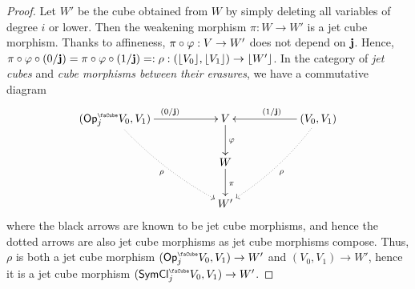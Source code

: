 \documentclass[a4paper]{memoir}
\begin{document}
\begin{proof}
	Let $W'$ be the cube obtained from $W$ by simply deleting all variables of degree $i$ or lower.
	Then the weakening morphism $\pi : W \to W'$ is a jet cube morphism.
	Thanks to affineness, $\pi \circ \varphi : V \to W'$ does not depend on $\mathbf{j}$.
	Hence, $\pi \circ \varphi \circ (0/\mathbf{j}) = \pi \circ \varphi \circ (1/\mathbf{j}) =: \rho : (\mathopen{}\left\lfloor V_0 \right\rfloor\mathclose{}, \mathopen{}\left\lfloor V_1 \right\rfloor\mathclose{}) \to \mathopen{}\left\lfloor W' \right\rfloor\mathclose{}$.
	In the category of \emph{jet cubes} and \emph{cube morphisms between their erasures}, we have a commutative diagram
	\[
		\xymatrix{
			(\Opcube_j V_0, V_1)
				\ar@{.>}@/_/[rrdd]_{\rho}
				\ar[rr]^{(0/\dm j)}
			&&
			V
				\ar[d]^\vfi
			&&
			(V_0, V_1)
				\ar@{.>}@/^/[lldd]^{\rho}
				\ar[ll]_{(1/\dm j)}
			\\
			&& W
				\ar[d]^\pi
			\\
			&& W'
		}
	\]
	where the black arrows are known to be jet cube morphisms, and hence the dotted arrows are also jet cube morphisms as jet cube morphisms compose.
	Thus, $\rho$ is both a jet cube morphism $(\Opcube_j V_0, V_1) \to W'$ and $(V_0, V_1) \to W'$, hence it is a jet cube morphism $(\UFsymcube_j V_0, V_1) \to W'$.
	

\end{proof}
\end{document}
